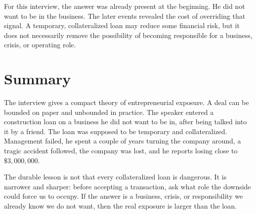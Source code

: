 For this interview, the answer was already present at the beginning. He did not want to be in the business. The later events revealed the cost of overriding that signal. A temporary, collateralized loan may reduce some financial risk, but it does not necessarily remove the possibility of becoming responsible for a business, crisis, or operating role.

\section{Summary}

The interview gives a compact theory of entrepreneurial exposure. A deal can be bounded on paper and unbounded in practice. The speaker entered a construction loan on a business he did not want to be in, after being talked into it by a friend. The loan was supposed to be temporary and collateralized. Management failed, he spent a couple of years turning the company around, a tragic accident followed, the company was lost, and he reports losing close to \(\$3{,}000{,}000\).

The durable lesson is not that every collateralized loan is dangerous. It is narrower and sharper: before accepting a transaction, ask what role the downside could force us to occupy. If the answer is a business, crisis, or responsibility we already know we do not want, then the real exposure is larger than the loan.

